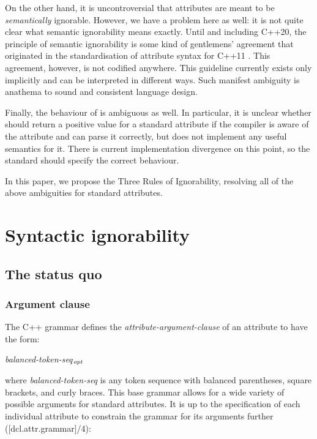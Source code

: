 On the other hand, it is uncontroversial that attributes are meant to be \emph{semantically} ignorable. However, we have a problem here as well: it is not quite clear what semantic ignorability means exactly. Until and including C++20, the principle of semantic ignorability is some kind of gentlemens' agreement that originated in the standardisation of attribute syntax for C++11 \cite{N2761}. This agreement, however, is not codified anywhere. This guideline currently exists only implicitly and can be interpreted in different ways. Such manifest ambiguity is anathema to sound and consistent language design.

Finally, the behaviour of  is ambiguous as well. In particular, it is unclear whether \mbox{} should return a positive value for a standard attribute if the compiler is aware of the attribute and can parse it correctly, but does not implement any useful semantics for it. There is current implementation divergence on this point, so the standard should specify the correct behaviour.

In this paper, we propose the Three Rules of Ignorability, resolving all of the above ambiguities for standard attributes.

\section{Syntactic ignorability}
\subsection{The status quo}

\label{subsec:syntax}
\subsubsection{Argument clause}
\label{subsubsec:args}

The C++ grammar defines the \emph{attribute-argument-clause} of an attribute to have the form:
\begin{adjustwidth}{0.5cm}{0.5cm}
\tcode{( }\emph{balanced-token-seq}$_\emph{opt}$\tcode{ )}
\end{adjustwidth}
where \emph{balanced-token-seq} is any token sequence with balanced parentheses, square brackets, and curly braces. This base grammar allows for a wide variety of possible arguments for standard attributes. It is up to the specification of each individual attribute to constrain the grammar for its arguments further ([dcl.attr.grammar]/4):

